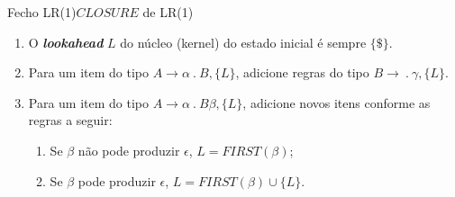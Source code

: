 \begin{frame}{Fecho LR(1)}{$CLOSURE$ de LR(1)}

	\begin{enumerate}
		\item O {\it \bf lookahead} $L$ do núcleo (kernel) do estado inicial
			é sempre $\{\$\}$.
		\item Para um item do tipo $A\rightarrow \alpha\ .\ B, \{L\}$,
			adicione regras do tipo $B\rightarrow\ .\ \gamma, \{L\}$.
		\item Para um item do tipo $A\rightarrow\alpha\ .\ B\beta, \{L\}$,
			adicione novos itens conforme as regras a seguir:
		\begin{enumerate}
			\item Se $\beta$ não pode produzir $\epsilon$, $L = FIRST(\beta)$;
			\item Se $\beta$ pode produzir $\epsilon$, $L = FIRST(\beta) \cup \{L\}$.
		\end{enumerate}
	\end{enumerate}

\end{frame}
